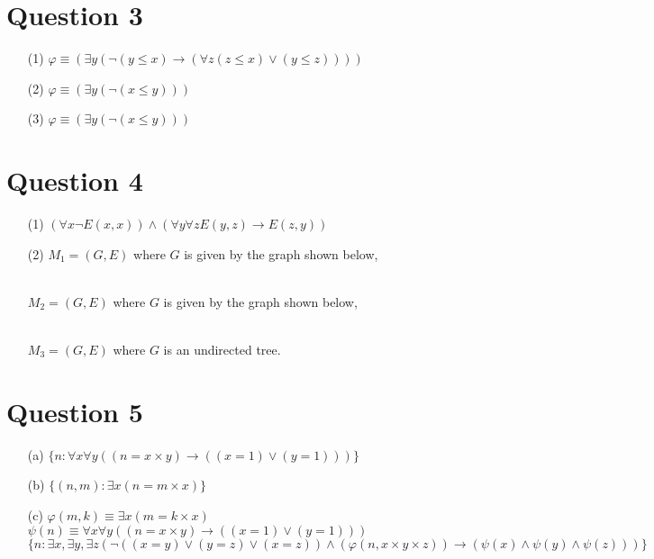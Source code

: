 \documentclass[10pt]{article}
\begin{document}
\section*{Question 3}
\begin{itemize}
    \item [(1)] $\varphi\equiv(\exists y (\lnot(y\le x)\rightarrow (\forall z(z\le x)\lor(y\le z))))$
    \item [(2)] $\varphi\equiv(\exists y(\lnot(x\le y)))$
    \item [(3)] $\varphi\equiv(\exists y(\lnot(x\le y)))$
\end{itemize}
\section*{Question 4}
\begin{itemize}
    \item [(1)] $(\forall x\lnot E(x,x))\land(\forall y\forall z E(y,z)\rightarrow E(z,y))$
    \item [(2)] $M_1=(G,E)$ where $G$ is given by the graph shown below,\\ 
    \\
    $M_2=(G,E)$ where $G$ is given by the graph shown below,\\
    \\
    $M_3=(G,E)$ where $G$ is an undirected tree.
    
\end{itemize}
\section*{Question 5}
\begin{itemize}
    \item [(a)] $\{n:\forall x\forall y((n=x\times y)\rightarrow((x=1)\lor(y=1)))\}$
    \item [(b)] $\{(n,m):\exists x(n=m\times x)\}$
    \item [(c)] $\varphi(m,k)\equiv\exists x(m=k\times x)$\\ 
    $\psi(n)\equiv \forall x\forall y((n=x\times y)\rightarrow((x=1)\lor(y=1)))$\\
    $\{n:\exists x,\exists y,\exists z(\lnot((x=y)\lor(y=z)\lor(x=z))\land(\varphi(n,x\times y\times z))\rightarrow (\psi(x)\land\psi(y)\land\psi(z)))\}$
\end{itemize}
\end{document}
